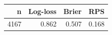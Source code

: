 \begin{tabular}{rrrr}
\toprule
n & Log-loss & Brier & RPS \\
\midrule
4167 & 0.862 & 0.507 & 0.168 \\
\bottomrule
\end{tabular}

